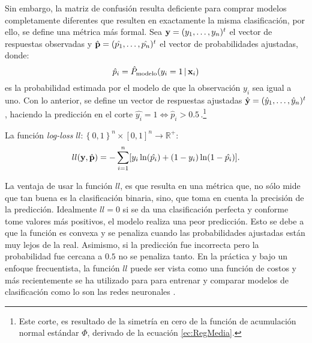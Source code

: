 \documentclass[../Main/Main.tex]{subfiles}
\begin{document}
Sin embargo, la matriz de confusión resulta deficiente para comprar modelos completamente diferentes que resulten en exactamente la misma clasificación, por ello, se define una métrica más formal. Sea $\mathbf{y} = (y_1,\ldots,y_n)^t$ el vector de respuestas observadas y \linebreak $\hat{\mathbf{p}} = (\hat{p_1},\ldots,\hat{p_n})^t$ el vector de probabilidades ajustadas, donde: $$\hat{p}_i = \hat{P}_{\text{modelo}}(y_i = 1\,|\,\mathbf{x}_i)$$ es la probabilidad estimada por el modelo de que la observación $y_i$ sea igual a uno. Con lo anterior, se define un vector de respuestas ajustadas $\hat{\mathbf{y}} = (\hat{y}_1,\ldots,\hat{y}_n)^t$, haciendo la predicción en el corte $\hat{y_i} = 1 \iff \hat{p}_i > 0.5\,$.\footnote{Este corte, es resultado de la simetría en cero de la función de acumulación normal estándar $\Phi$, derivado de la ecuación \eqref{ec:RegMedia}.}
\begin{definition}
La función \textit{log-loss} $ll:\left\{0,1\right\}^n\times[0,1]^n\rightarrow \mathbb{R}^+$:
\begin{align}
	ll(\mathbf{y},\hat{\mathbf{p}}) = -\sum_{i = 1}^n[ y_i \ln(\hat{p_i}) + (1-y_i)\ln(1-\hat{p_i})]. \label{ec:LogLoss}
\end{align}
\end{definition}
La ventaja de usar la función $ll$, es que resulta en una métrica que, no sólo mide que tan buena es la clasificación binaria, sino, que toma en cuenta la precisión de la predicción. Idealmente $ll = 0$ si se da una clasificación perfecta y conforme tome valores más positivos, el modelo realiza una peor predicción. Esto se debe a que la función es convexa y se penaliza cuando las probabilidades ajustadas están muy lejos de la real. Asimismo, si la predicción fue incorrecta pero la probabilidad fue cercana a $0.5$ no se penaliza tanto.  En la práctica y bajo un enfoque frecuentista, la función $ll$ puede ser vista como una función de costos y más recientemente se ha utilizado para para entrenar y comparar modelos de clasificación como lo son las redes neuronales \autocite{nielsen2015neural}.
\end{document}
